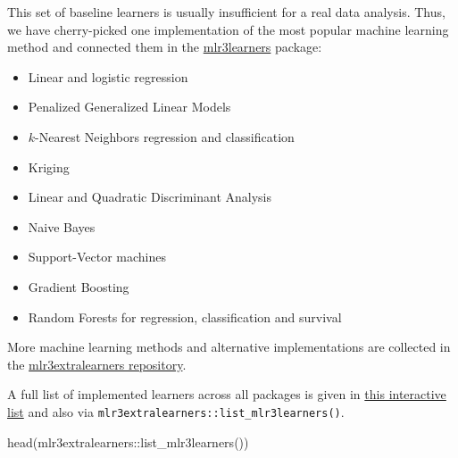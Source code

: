 \documentclass[
]{scrbook}
\makeatletter
\newenvironment{Shaded}{\begin{snugshade}}{\end{snugshade}}
\newcommand{\FunctionTok}[1]{\textcolor[rgb]{0.00,0.00,0.00}{#1}}
\newcommand{\NormalTok}[1]{#1}
\newcommand{\SpecialCharTok}[1]{\textcolor[rgb]{0.00,0.00,0.00}{#1}}
\providecommand{\tightlist}{%
  \setlength{\itemsep}{0pt}\setlength{\parskip}{0pt}}
\renewenvironment{Shaded} {\begin{snugshade}\small} {\end{snugshade}}
\newenvironment{kframe}{%
\medskip{}
\setlength{\fboxsep}{.8em}
 \def\at@end@of@kframe{}%
 \ifinner\ifhmode%
  \def\at@end@of@kframe{\end{minipage}}%
  \begin{minipage}{\columnwidth}%
 \fi\fi%
 \def\FrameCommand##1{\hskip\@totalleftmargin \hskip-\fboxsep
 \colorbox{shadecolor}{##1}\hskip-\fboxsep
     \hskip-\linewidth \hskip-\@totalleftmargin \hskip\columnwidth}%
 \MakeFramed {\advance\hsize-\width
   \@totalleftmargin\z@ \linewidth\hsize
   \@setminipage}}%
 {\par\unskip\endMakeFramed%
 \at@end@of@kframe}
\newenvironment{rmdblock}[1]
  {
  \begin{itemize}
  \renewcommand{\labelitemi}{
    \raisebox{-.7\height}[0pt][0pt]{
      {\setkeys{Gin}{width=3em,keepaspectratio}\texttt{[image: images/\#1]}}
    }
  }
  \setlength{\fboxsep}{1em}
  \begin{kframe}
  \item
  }
  {
  \end{kframe}
  \end{itemize}
  }
\newenvironment{rmdnote}
  {\begin{rmdblock}{note}}
  {\end{rmdblock}}
\makeatother
\begin{document}
This set of baseline learners is usually insufficient for a real data analysis.
Thus, we have cherry-picked one implementation of the most popular machine learning method and connected them in the \href{https://mlr3learners.mlr-org.com}{mlr3learners} package:

\begin{itemize}
\tightlist
\item
  Linear and logistic regression
\item
  Penalized Generalized Linear Models
\item
  \(k\)-Nearest Neighbors regression and classification
\item
  Kriging
\item
  Linear and Quadratic Discriminant Analysis
\item
  Naive Bayes
\item
  Support-Vector machines
\item
  Gradient Boosting
\item
  Random Forests for regression, classification and survival
\end{itemize}

More machine learning methods and alternative implementations are collected in the \href{https://github.com/mlr-org/mlr3extralearners/}{mlr3extralearners repository}.

\begin{rmdnote}
A full list of implemented learners across all packages is given in
\href{https://mlr3extralearners.mlr-org.com/articles/learners/list_learners.html}{this
interactive list} and also via
\texttt{mlr3extralearners::list\_mlr3learners()}.
\end{rmdnote}

\begin{Shaded}
\begin{Highlighting}[]
\FunctionTok{head}\NormalTok{(mlr3extralearners}\SpecialCharTok{::}\FunctionTok{list\_mlr3learners}\NormalTok{())}
\end{Highlighting}
\end{Shaded}
\end{document}
